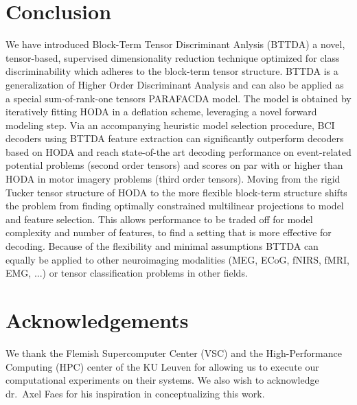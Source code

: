 \section{Conclusion}
We have introduced Block-Term Tensor Discriminant Anlysis (BTTDA) a novel,
tensor-based, supervised dimensionality reduction technique optimized for class
discriminability which adheres to the block-term tensor structure.
BTTDA is a generalization of Higher Order Discriminant Analysis and can also be
applied as a special sum-of-rank-one tensors PARAFACDA model.
The model is obtained by iteratively fitting HODA in a deflation scheme,
leveraging a novel forward modeling step.
Via an accompanying heuristic model selection procedure, BCI decoders using BTTDA
feature extraction can significantly outperform decoders based on HODA and
reach state-of-the art decoding performance on event-related potential
problems (second order tensors) and scores on par with or higher than HODA  in motor
imagery problems (third order tensors).
Moving from the rigid Tucker tensor structure of HODA to the more flexible
block-term structure shifts the problem from finding optimally constrained multilinear
projections to model and feature selection.
This allows performance to be traded
off for model complexity and number of features, to find a setting that is more
effective for decoding.
Because of the flexibility and minimal assumptions BTTDA
can equally be applied to other neuroimaging modalities (MEG, ECoG, fNIRS,
fMRI, EMG, ...) or tensor classification problems in other fields.

\section*{Acknowledgements}
We thank the Flemish Supercomputer Center (VSC) and the High-Performance
Computing (HPC) center of the KU Leuven for allowing us to execute our
computational experiments on their systems.
We also wish to acknowledge dr.\ Axel Faes for his inspiration in conceptualizing this
work.
